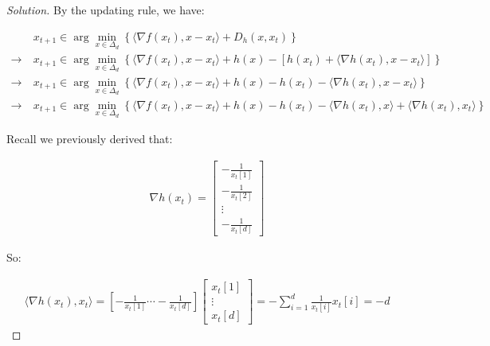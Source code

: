 \documentclass{article}
\newenvironment{solution}
  {\renewcommand\qedsymbol{$\blacksquare$}\begin{proof}[Solution]}
  {\end{proof}}
\begin{document}
\begin{solution}
    By the updating rule, we have:

    \begin{align*}
        &x_{t + 1} 
        \in
        \arg\min_{x \in \Delta_d}
        \left\{
        \langle \nabla f(x_t), x - x_t \rangle + D_h(x, x_t)
        \right\} \\
        \rightarrow \ &
        x_{t + 1} 
        \in
        \arg\min_{x \in \Delta_d}
        \left\{
        \langle \nabla f(x_t), x - x_t \rangle + h(x) - \left[ h(x_t) + \langle \nabla h(x_t), x - x_t \rangle \right]
        \right\} \\
        \rightarrow \ &
        x_{t + 1} 
        \in
        \arg\min_{x \in \Delta_d}
        \left\{
        \langle \nabla f(x_t), x - x_t \rangle + h(x) - h(x_t) - \langle \nabla h(x_t), x - x_t \rangle \right\} \\
        \rightarrow \ &
        x_{t + 1} 
        \in
        \arg\min_{x \in \Delta_d}
        \left\{
        \langle \nabla f(x_t), x - x_t \rangle + h(x) - h(x_t) - \langle \nabla h(x_t), x \rangle + \langle \nabla h(x_t), x_t \rangle \right\} \tag{1}
    \end{align*}

    Recall we previously derived that:

    \begin{align*}
        \nabla h(x_t) 
        = \begin{bmatrix}
            -\frac{1}{x_t[1]} \\
            -\frac{1}{x_t[2]} \\
            \vdots \\
            -\frac{1}{x_t[d]}
        \end{bmatrix}
    \end{align*}

    So:

    \begin{align*}
        \langle \nabla h(x_t), x_t \rangle
        = \left[ -\frac{1}{x_t[1]} \cdots -\frac{1}{x_t[d]} \right]
        \begin{bmatrix}
            x_t[1] \\
            \vdots \\
            x_t[d]
        \end{bmatrix}
        = - \sum_{i = 1}^d \frac{1}{x_t[i]} x_t[i] = -d
    \end{align*}


\end{solution}
\end{document}
